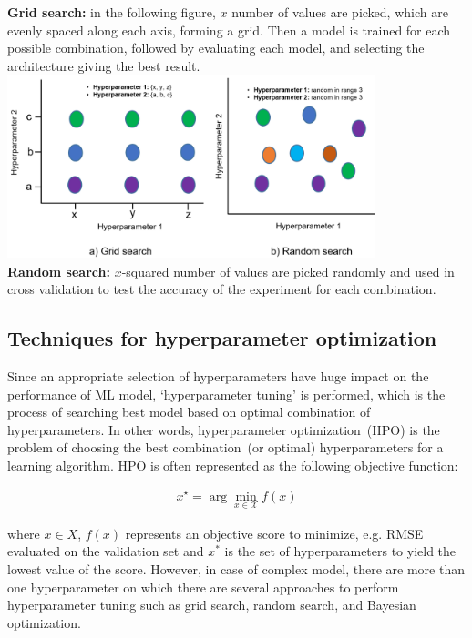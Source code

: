 \begin{tcolorbox}[colback=white!3!white,colframe=gray!120!black,title=\faBook~Random vs. grid search for hyperparameter optimization]
    \scriptsize{
        \textbf{Grid search:} in the following figure, $x$ number of values are picked, which are evenly spaced along each axis, forming a grid. Then a model is trained for each possible combination, followed by evaluating each model, and selecting the architecture giving the best result. \\
        }
    \includegraphics[width=0.8\textwidth]{images/gvr.png}\\ 
    \scriptsize{
        \textbf{Random search:} $x$-squared number of values are picked randomly and used in cross validation to test the accuracy of the experiment for each combination.
        } 
\end{tcolorbox}

\subsection{Techniques for hyperparameter optimization}
Since an appropriate selection of hyperparameters have huge impact on the performance of ML model, `hyperparameter tuning' is performed, which is the process of searching best model based on optimal combination of hyperparameters. In other words, hyperparameter optimization~(HPO) is the problem of choosing the best combination~(or optimal) hyperparameters for a learning algorithm. HPO is often represented as the following objective function: 

\vspace{-6mm}
\begin{align}
    x^{\star}=\arg \min _{x \in \mathcal{X}} f(x)
    \label{eq:hpt}
\end{align}

where $x \in X$, $f(x)$ represents an objective score to minimize, e.g. RMSE evaluated on the validation set and $x^*$ is the set of hyperparameters to yield the lowest value of the score. However, in case of complex model, there are more than one hyperparameter on which there are several approaches to perform hyperparameter tuning such as grid search, random search, and Bayesian optimization. \\

